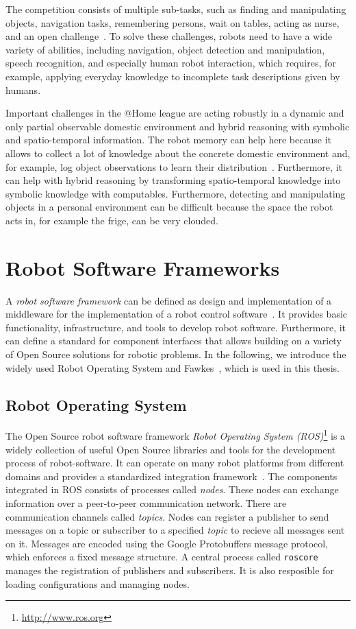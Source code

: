 The competition consists of multiple sub-tasks,
such as finding and manipulating objects, navigation tasks,
remembering persons, wait on tables, acting as
nurse, and an open challenge~\cite{athome-rules}.
To solve these challenges, robots need to
have a wide variety of abilities, including navigation, object
detection and manipulation, speech recognition, and especially human
robot interaction, which requires, for example, applying everyday
knowledge to incomplete task descriptions given by humans.

Important challenges in the @Home league are acting robustly in a
dynamic and only partial observable domestic environment and hybrid
reasoning with symbolic and spatio-temporal information.
The robot memory can help here because it allows to collect a lot
of knowledge about the concrete domestic environment and, for example,
log object observations to learn their distribution~\cite{deebul}.
Furthermore, it can help with hybrid reasoning by transforming
spatio-temporal knowledge into symbolic knowledge with computables.
Furthermore, detecting and manipulating objects in a personal
environment can be difficult because the space the robot acts in, for
example the frige, can be very clouded.

\section{Robot Software Frameworks}
\label{sec:robot-software-frameworks}
A \emph{robot software framework} can be defined as design and
implementation of a middleware for the implementation of a robot
control software~\cite{tnthesis,orocos}. It provides basic functionality,
infrastructure, and tools to develop robot software. Furthermore, it
can define a standard for component interfaces that allows building on
a variety of Open Source solutions for robotic problems. In the
following, we introduce the widely used Robot Operating System and
Fawkes~\cite{Gazsim-Thesis}, which is used in this thesis.
\subsection{Robot Operating System}
\label{sec:ros}
The Open Source robot software framework \emph{Robot Operating System
  (ROS)}\footnote{\url{http://www.ros.org}} is a widely collection of
useful Open Source libraries and tools for the development process of
robot-software. It can operate on many robot platforms from different
domains and provides a standardized integration framework~\cite{Ros}.
 The components integrated in ROS consists
of processes called \emph{nodes}. These nodes can exchange information
over a peer-to-peer communication network. There are communication
channels called \emph{topics}. Nodes can register a publisher to send
messages on a topic or subscriber to a specified \emph{topic} to
recieve all messages sent on it. Messages are encoded using the Google
Protobuffers message protocol, which enforces a fixed message
structure. A central process called \texttt{roscore} manages the
registration of publishers and subscribers. It is also resposible for
loading configurations and managing nodes.

